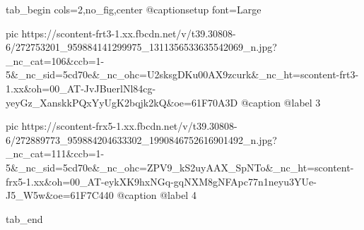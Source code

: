  
 
 
 
 


\ifcmt
  tab_begin cols=2,no_fig,center
     @captionsetup font=Large

     pic https://scontent-frt3-1.xx.fbcdn.net/v/t39.30808-6/272753201_959884141299975_1311356533635542069_n.jpg?_nc_cat=106&ccb=1-5&_nc_sid=5cd70e&_nc_ohc=U2sksgDKu00AX9zcurk&_nc_ht=scontent-frt3-1.xx&oh=00_AT-JvJBuerlNl84cg-yeyGz_XanskkPQxYyUgK2bqjk2kQ&oe=61F70A3D
     @caption @label 3

     pic https://scontent-frx5-1.xx.fbcdn.net/v/t39.30808-6/272889773_959884204633302_1990846752616901492_n.jpg?_nc_cat=111&ccb=1-5&_nc_sid=5cd70e&_nc_ohc=ZPV9_kS2uyAAX_SpNTo&_nc_ht=scontent-frx5-1.xx&oh=00_AT-eykXK9hxNGq-gqNXM8gNFApc77n1neyu3YUe-J5_W5w&oe=61F7C440
     @caption @label 4

  tab_end
\fi
